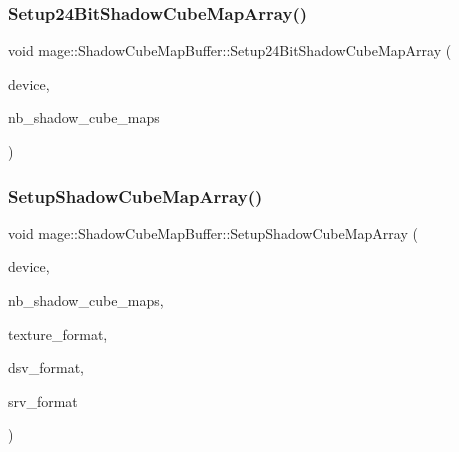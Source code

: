 \subsubsection{\texorpdfstring{Setup24\+Bit\+Shadow\+Cube\+Map\+Array()}{Setup24BitShadowCubeMapArray()}}
{\footnotesize\ttfamily void mage\+::\+Shadow\+Cube\+Map\+Buffer\+::\+Setup24\+Bit\+Shadow\+Cube\+Map\+Array (\begin{DoxyParamCaption}\item[{I\+D3\+D11\+Device2 $\ast$}]{device,  }\item[{size\+\_\+t}]{nb\+\_\+shadow\+\_\+cube\+\_\+maps }\end{DoxyParamCaption})\hspace{0.3cm}{\ttfamily [private]}}

\hypertarget{structmage_1_1_shadow_cube_map_buffer_a583020f593e4a02f6eda0103f56042bd}{}\label{structmage_1_1_shadow_cube_map_buffer_a583020f593e4a02f6eda0103f56042bd} 
\subsubsection{\texorpdfstring{Setup\+Shadow\+Cube\+Map\+Array()}{SetupShadowCubeMapArray()}}
{\footnotesize\ttfamily void mage\+::\+Shadow\+Cube\+Map\+Buffer\+::\+Setup\+Shadow\+Cube\+Map\+Array (\begin{DoxyParamCaption}\item[{I\+D3\+D11\+Device2 $\ast$}]{device,  }\item[{size\+\_\+t}]{nb\+\_\+shadow\+\_\+cube\+\_\+maps,  }\item[{D\+X\+G\+I\+\_\+\+F\+O\+R\+M\+AT}]{texture\+\_\+format,  }\item[{D\+X\+G\+I\+\_\+\+F\+O\+R\+M\+AT}]{dsv\+\_\+format,  }\item[{D\+X\+G\+I\+\_\+\+F\+O\+R\+M\+AT}]{srv\+\_\+format }\end{DoxyParamCaption})\hspace{0.3cm}{\ttfamily [private]}}

\hypertarget{structmage_1_1_shadow_cube_map_buffer_acbdfc3eaf61ba5b4638033b804f90e86}{}\label{structmage_1_1_shadow_cube_map_buffer_acbdfc3eaf61ba5b4638033b804f90e86} 
